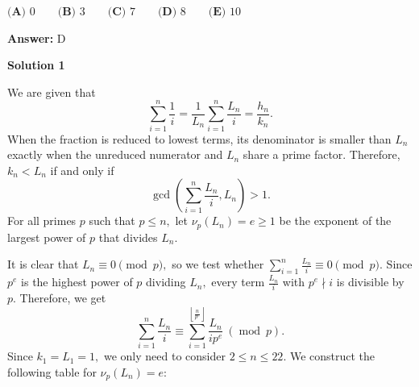 \begin{enumerate}
 $\textbf{(A) }0 \qquad\textbf{(B) }3 \qquad\textbf{(C) }7 \qquad\textbf{(D) }8\qquad\textbf{(E) }10$

 \textbf{Answer: }D



\textbf{Solution 1}

We are given that 
 \[\sum_{i=1}^{n}\frac1i = \frac{1}{L_n}\sum_{i=1}^{n}\frac{L_n}{i} = \frac{h_n}{k_n}.\] When the fraction is reduced to lowest terms, its denominator is smaller than $L_n$ exactly when the unreduced numerator and $L_n$ share a prime factor. Therefore, $k_n < L_n$ if and only if 
 \[\gcd\left(\sum_{i=1}^{n}\frac{L_n}{i}, L_n\right)>1.\]For all primes $p$ such that $p\leq n,$ let $\nu_p(L_n)=e\geq1$ be the exponent of the largest power of $p$ that divides $L_n.$

 It is clear that $L_n\equiv0\pmod{p},$ so we test whether $\sum_{i=1}^{n}\frac{L_n}{i}\equiv0\pmod{p}.$ Since $p^e$ is the highest power of $p$ dividing $L_n,$ every term $\frac{L_n}{i}$ with $p^e\nmid i$ is divisible by $p.$ Therefore, we get 
 \[\sum_{i=1}^{n}\frac{L_n}{i} \equiv \sum_{i=1}^{\left\lfloor\frac{n}{p^e}\right\rfloor}\frac{L_n}{ip^e} \ (\operatorname{mod} \ p).\]Since $k_1=L_1=1,$ we only need to consider $2\leq n\leq22.$ We construct the following table for $\nu_p(L_n)=e:$

\end{enumerate}
